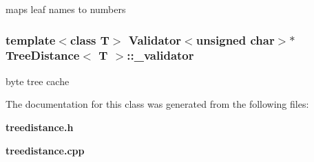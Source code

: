 maps leaf names to numbers 

\subsubsection{\setlength{\rightskip}{0pt plus 5cm}template$<$class T$>$ {\bf Validator}$<$unsigned char$>$$\ast$ {\bf Tree\-Distance}$<$ T $>$::{\bf \_\-validator}\hspace{0.3cm}{\tt  [protected]}}\label{classTreeDistance_p16}


byte tree cache 



The documentation for this class was generated from the following files:\begin{CompactItemize}
\item 
{\bf treedistance.h}\item 
{\bf treedistance.cpp}\end{CompactItemize}
